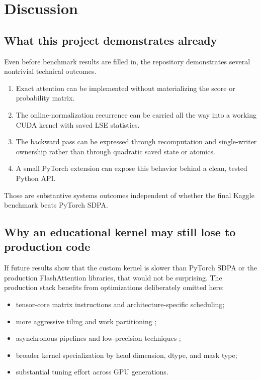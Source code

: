 \chapter{Discussion}
\label{chap:discussion}

\section{What this project demonstrates already}

Even before benchmark results are filled in, the repository demonstrates several nontrivial technical outcomes.

\begin{enumerate}
  \item Exact attention can be implemented without materializing the score or probability matrix.
  \item The online-normalization recurrence can be carried all the way into a working CUDA kernel with saved LSE statistics.
  \item The backward pass can be expressed through recomputation and single-writer ownership rather than through quadratic saved state or atomics.
  \item A small PyTorch extension can expose this behavior behind a clean, tested Python API.
\end{enumerate}

Those are substantive systems outcomes independent of whether the final Kaggle benchmark beats PyTorch SDPA.

\section{Why an educational kernel may still lose to production code}

If future results show that the custom kernel is slower than PyTorch SDPA or the production FlashAttention libraries, that would not be surprising. The production stack benefits from optimizations deliberately omitted here:
\begin{itemize}
  \item tensor-core matrix instructions and architecture-specific scheduling;
  \item more aggressive tiling and work partitioning \citep{dao2024flashattention2};
  \item asynchronous pipelines and low-precision techniques \citep{shah2024flashattention3};
  \item broader kernel specialization by head dimension, dtype, and mask type;
  \item substantial tuning effort across GPU generations.
\end{itemize}

